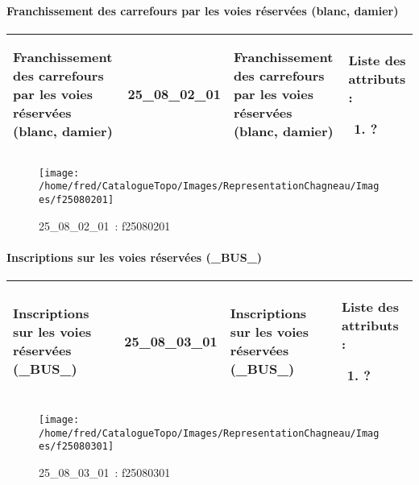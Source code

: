 \documentclass[12pt,titlepage]{book}
\begin{document}
\paragraph{Franchissement des carrefours par les voies réservées (blanc, damier)}
\noindent
\vspace{\baselineskip}

\renewcommand{\arraystretch}{1.2}
\begin{supertabular}{|p{10cm}|c|p{13cm}|p{12cm}|}
 Franchissement des carrefours par les voies réservées (blanc, damier) & 25\_08\_02\_01 & Franchissement des carrefours par les voies réservées (blanc, damier) & Liste des attributs :
\begin{enumerate}
  \item ?\end{enumerate}
\\
\hline
\end{supertabular}
\begin{figure}[h!]
  \hfill         %
  \begin{minipage}[t]{3cm}
    \begin{center}
      \texttt{[image: /home/fred/CatalogueTopo/Images/RepresentationChagneau/Images/f25080201]}
      \caption[~25\_08\_02\_01]{\small{25\_08\_02\_01~:} \tiny{f25080201}}\label{f25080201}
    \end{center}
  \end{minipage}
\end{figure}


\paragraph{Inscriptions sur les voies réservées (\_BUS\_)}
\noindent
\vspace{\baselineskip}

\renewcommand{\arraystretch}{1.2}
\begin{supertabular}{|p{10cm}|c|p{13cm}|p{12cm}|}
 Inscriptions sur les voies réservées (\_BUS\_) & 25\_08\_03\_01 & Inscriptions sur les voies réservées (\_BUS\_) & Liste des attributs :
\begin{enumerate}
  \item ?\end{enumerate}
\\
\hline
\end{supertabular}
\begin{figure}[h!]
  \hfill         %
  \begin{minipage}[t]{3cm}
    \begin{center}
      \texttt{[image: /home/fred/CatalogueTopo/Images/RepresentationChagneau/Images/f25080301]}
      \caption[~25\_08\_03\_01]{\small{25\_08\_03\_01~:} \tiny{f25080301}}\label{f25080301}
    \end{center}
  \end{minipage}
\end{figure}
\end{document}
